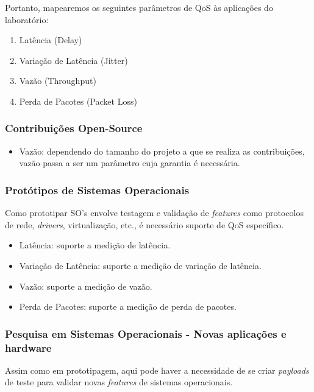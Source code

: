 Portanto, mapearemos os seguintes parâmetros de QoS às aplicações do laboratório:

\begin{enumerate}
    \item Latência (Delay)
    \item Variação de Latência (Jitter)
    \item Vazão (Throughput)
    \item Perda de Pacotes (Packet Loss)
\end{enumerate}

\subsubsection{Contribuições Open\--Source}

\begin{itemize}
    \item Vazão: dependendo do tamanho do projeto a que se realiza
        as contribuições, vazão passa a ser um parâmetro cuja
        garantia é necessária.
\end{itemize}

\subsubsection{Protótipos de Sistemas Operacionais}

Como prototipar SO's envolve testagem e validação de \textit{features}
como protocolos de rede, \textit{drivers}, virtualização, etc., é
necessário suporte de QoS específico.

\begin{itemize}
    \item Latência: suporte a medição de latência.
    \item Variação de Latência: suporte a medição de variação de latência.
    \item Vazão: suporte a medição de vazão.
    \item Perda de Pacotes: suporte a medição de perda de pacotes.
\end{itemize}

\subsubsection{Pesquisa em Sistemas Operacionais \-- Novas aplicações e hardware}

Assim como em prototipagem, aqui pode haver a necessidade de se criar
\textit{payloads} de teste para validar novas \textit{features} de
sistemas operacionais.

